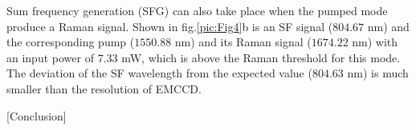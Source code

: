 \documentclass[a4paper,8pt,hyperref, twocolumn]{article}
\begin{document}

Sum frequency generation (SFG) can also take place when the pumped mode produce a Raman signal. 
Shown in fig.\ref{pic:Fig4}b is an SF signal ($804.67$ nm) and the corresponding pump ($1550.88$ nm) and its Raman signal ($1674.22$ nm) with an input power of $7.33$ mW, which is above the Raman threshold for this mode. The deviation of the SF wavelength from the expected value ($804.63$ nm) is much smaller than the resolution of EMCCD.

[Conclusion]





\end{document}
